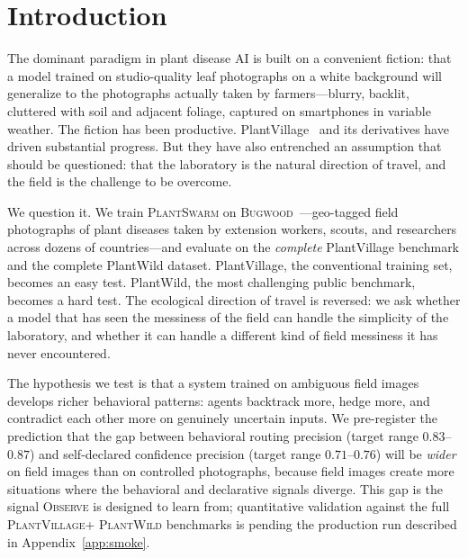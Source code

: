 \documentclass[11pt,twocolumn]{article}
\newcommand{\observe}{\textsc{Observe}\xspace}
\newcommand{\plantswarm}{\textsc{PlantSwarm}\xspace}
\newcommand{\bugwood}{\textsc{Bugwood}\xspace}
\newcommand{\pv}{\textsc{PlantVillage}\xspace}
\newcommand{\pw}{\textsc{PlantWild}\xspace}
\begin{document}
\section{Introduction}
\label{sec:intro}

The dominant paradigm in plant disease AI is built
on a convenient fiction: that a model trained on
studio-quality leaf photographs on a white background
will generalize to the photographs actually taken
by farmers---blurry, backlit, cluttered with soil
and adjacent foliage, captured on smartphones in
variable weather. The fiction has been productive.
PlantVillage~\citep{mohanty2016plantvillage} and
its derivatives have driven substantial progress.
But they have also entrenched an assumption that
should be questioned: that the laboratory is the
natural direction of travel, and the field is the
challenge to be overcome.

We question it. We train \plantswarm on
\bugwood~\citep{bugwood}---geo-tagged field
photographs of plant diseases taken by extension
workers, scouts, and researchers across
dozens of countries---and evaluate on the
\emph{complete} PlantVillage benchmark and the
complete PlantWild dataset. PlantVillage, the
conventional training set, becomes an easy
test. PlantWild, the most challenging public
benchmark, becomes a hard test. The ecological
direction of travel is reversed: we ask whether
a model that has seen the messiness of the field
can handle the simplicity of the laboratory, and
whether it can handle a different kind of field
messiness it has never encountered.

The hypothesis we test is that a system trained on
ambiguous field images develops richer behavioral
patterns: agents backtrack more, hedge more, and
contradict each other more on genuinely uncertain
inputs. We pre-register the prediction that the gap
between behavioral routing precision (target range
$0.83$--$0.87$) and self-declared confidence precision
(target range $0.71$--$0.76$) will be \emph{wider} on
field images than on controlled photographs, because
field images create more situations where the
behavioral and declarative signals diverge. This
gap is the signal \observe is designed to learn
from; quantitative validation against the full \pv +
\pw benchmarks is pending the production run
described in Appendix~\ref{app:smoke}.
\end{document}
